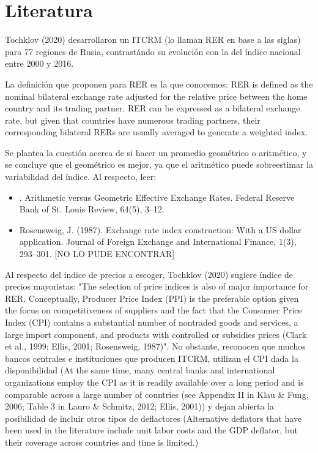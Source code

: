 \chapter{Literatura}\label{chap2} 


Tochklov (2020) desarrollaron un ITCRM (lo llaman RER en base a las siglas) para 77 regiones de Rusia, contrastándo su evolución con la del índice nacional entre 2000 y 2016. 

La definición que proponen para RER es la que conocemos:
{
RER is defined as the nominal bilateral exchange rate
adjusted for the relative price between the home country and its trading partner. RER can be expressed
as a bilateral exchange rate, but given that countries have numerous trading partners, their corresponding
bilateral RERs are usually averaged to generate a weighted index.
}

Se plantea la cuestión acerca de si hacer un promedio geométrico o aritmético, y se concluye que el geométrico es mejor, ya que el aritmético puede sobreestimar la variabilidad del índice. Al respecto, leer:

\begin{itemize}
    \item \citet{brodsky_1982}. Arithmetic versus Geometric Effective Exchange Rates. Federal Reserve Bank of St. Louis Review, 64(5), 3–12.
    \item Rosensweig, J. (1987). Exchange rate index construction: With a US dollar application. Journal of Foreign Exchange and International Finance, 1(3), 293–301. [NO LO PUDE ENCONTRAR]
\end{itemize}

Al respecto del índice de precios a escoger, Tochklov (2020) sugiere índice de precios mayoristas: "The selection of price indices is also of major importance for RER. Conceptually, Producer Price Index (PPI) is the preferable option given the focus on competitiveness of suppliers and the fact that the
Consumer Price Index (CPI) contains a substantial number of nontraded goods and services, a large import component, and products with controlled or subsidies prices (Clark et al., 1999; Ellis, 2001; Rosensweig, 1987)". No obstante, reconocen que muchos bancos centrales e instituciones que producen ITCRM, utilizan el CPI dada la disponibilidad (At the same time, many central banks and international organizations employ the CPI as it is readily available over a long period and is comparable across a large number of countries (see Appendix II in Klau \& Fung, 2006; Table 3 in Lauro \& Schmitz, 2012; Ellis, 2001)) y dejan abierta la posibilidad de incluir otros tipos de deflactores (Alternative deflators that have been used in the literature include unit labor costs and the GDP deflator, but their coverage across countries and time is limited.)

